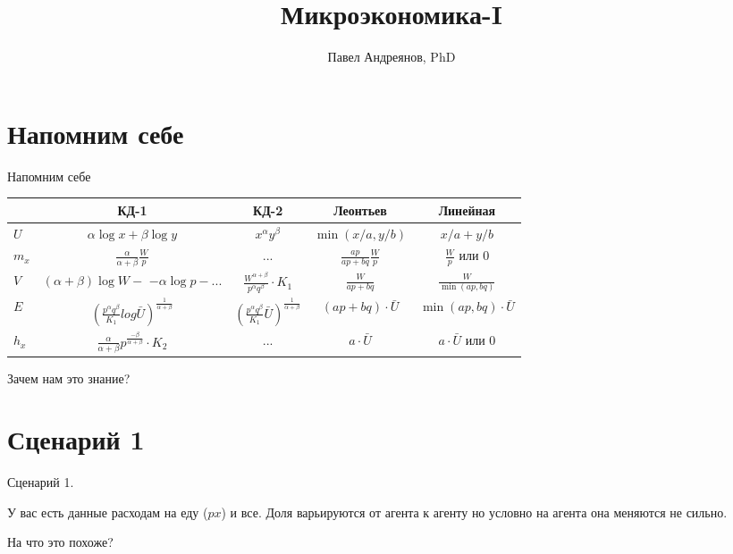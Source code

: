 \documentclass{beamer}
\title{
Микроэкономика-I
}
\author{
Павел Андреянов, PhD
}
\begin{document}
\maketitle

\section{Напомним себе}

\begin{frame}{Напомним себе}

\begin{table}[hbt]
\centering
\begin{adjustbox}{width=1\textwidth}
  \begin{tabular}{l|c|c|c|c|}
    & КД-1 & КД-2 & Леонтьев & Линейная \\
    \hline
    $U$ & $\alpha \log x + \beta \log y$ & $x^{\alpha} y^{\beta}$ & $\min(x/a, y/b)$ & $x/a + y/b$ \\
    \hline
    $m_x$ & $\frac{\alpha}{\alpha + \beta} \frac{W}{p}$ & ... & $\frac{ap}{ap+bq}\frac{W}{p}$ & $\frac{W}{p}$ или $0$ \\
    \hline
    $V$ & \makecell[l]{$(\alpha + \beta)\log W - $\\ $- \alpha \log p - ...$} & $\frac{W^{\alpha + \beta}}{p^{\alpha} q^{\beta}} \cdot K_1$ & $\frac{W}{ap + bq}$& $\frac{W}{\min(ap,bq)}$ \\
    \hline
    $E$ & $(\frac{p^{\alpha} q^{\beta}}{K_1} 
    log \bar U)^{\frac{1}{\alpha + \beta}}$ & $(\frac{p^{\alpha} q^{\beta}}{K_1} \bar U)^{\frac{1}{\alpha + \beta}}$ & $(ap+bq) \cdot \bar U$ & $\min(ap,bq) \cdot \bar U$\\
    \hline
    $h_x$ & $\frac{\alpha}{\alpha + \beta} p^{\frac{-\beta}{\alpha + \beta}} \cdot K_2$ & ... & $a \cdot \bar U$ & $a \cdot \bar U$ или $0$\\
    \hline
  \end{tabular}
  \end{adjustbox}
\end{table}
Зачем нам это знание?

\end{frame}

\section{Сценарий 1}

\begin{frame}{Сценарий 1.}

У вас есть данные расходам на еду ($p x$) и все. Доля варьируются от агента к агенту но условно на агента она меняются не сильно.

На что это похоже?

\end{frame}
\end{document}
